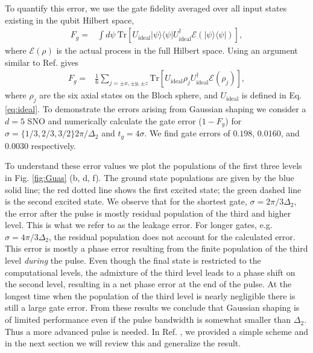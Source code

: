\documentclass[pra,twocolumn,floatfix,superscriptaddress,eqsecnum]{revtex4-1}
\newcommand{\dg}{^\dagger}
\newcommand{\bra}[1]{\langle{#1}|}
\newcommand{\ket}[1]{|{#1}\rangle}
\begin{document}
To quantify this error, we use the gate fidelity averaged over all input states existing in the qubit Hilbert space,
\begin{equation}
	\begin{split}	
		F_g	=&\int d\psi ~\mathrm{Tr}\left[U_\mathrm{ideal} \ket{\psi}\bra{\psi} U_\mathrm{ideal}\dg \mathcal{E}(\ket{\psi}\bra{\psi})\right],
	\end{split}
\end{equation} where $\mathcal{E}(\rho)$ is the actual process in the full Hilbert space. Using an argument similar to Ref. \cite{Bowdrey2002} gives
\begin{equation}
	\begin{split}\label{eq:fid}	
		F_g	=&\frac{1}{6}\sum_{j=\pm x, \pm y, \pm z}\mathrm{Tr}\left[U_\mathrm{ideal} \rho_j U_\mathrm{ideal}\dg \mathcal{E}(\rho_j)\right],
	\end{split}
\end{equation}
where $\rho_j$ are the six axial states on the Bloch sphere, and $U_\mathrm{ideal}$ is defined in Eq. \eqref{eq:ideal}. To demonstrate the errors arising from Gaussian shaping we consider a $d=5$ SNO and numerically calculate the gate error ($1-F_g$) for $\sigma =\{1/3,2/3,3/2\}2\pi/\Delta_2$ and $t_g=4\sigma$. We find gate errors of $0.198$, $0.0160$, and $0.0030$ respectively.

To understand these error values we plot the populations of the first three levels in Fig. \ref{fig:Guas} (b, d, f). The ground state populations are given by the blue solid line; the red dotted line shows the first excited state; the green dashed line is the second excited state. We observe that for the shortest gate, $\sigma=2\pi/3\Delta_2$,  the error after the pulse is mostly residual population of the third and higher level. This is what we refer to as the leakage error. For longer gates, e.g. $\sigma=4\pi/3\Delta_2$, the residual population does not account for the calculated error. This error is mostly a phase error resulting from the finite population of the third level {\em during} the pulse. Even though the final state is restricted to the computational levels, the admixture of the third level leads to a phase shift on the second level, resulting in a net phase error at the end of the pulse. At the longest time when the population of the third level is nearly negligible there is still a large gate error. From these results we conclude that Gaussian shaping is of limited performance even if the pulse bandwidth is somewhat smaller than $\Delta_2$. Thus a more advanced pulse is needed. In Ref. \cite{Motzoi2009}, we provided a simple scheme and in the next section we will review this and generalize the result.  
\end{document}
